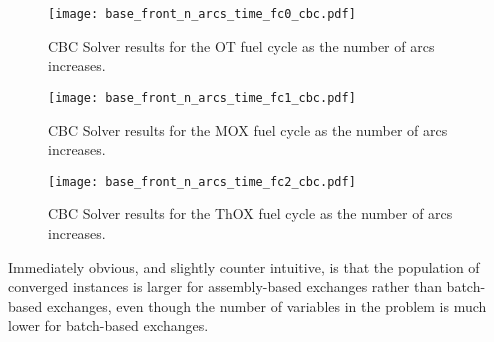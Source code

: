 \begin{figure}[h!]
  \begin{center}
    \texttt{[image: base\_front\_n\_arcs\_time\_fc0\_cbc.pdf]}
    \caption[]{
      \label{fig:base_front_n_arcs_time_fc0_cbc}
      CBC Solver results for the OT fuel cycle as the number of arcs
      increases.
      }
  \end{center}
\end{figure}

\begin{figure}[h!]
  \begin{center}
    \texttt{[image: base\_front\_n\_arcs\_time\_fc1\_cbc.pdf]}
    \caption[]{
      \label{fig:base_front_n_arcs_time_fc1_cbc}
      CBC Solver results for the MOX fuel cycle as the number of arcs
      increases.
      }
  \end{center}
\end{figure}

\begin{figure}[h!]
  \begin{center}
    \texttt{[image: base\_front\_n\_arcs\_time\_fc2\_cbc.pdf]}
    \caption[]{
      \label{fig:base_front_n_arcs_time_fc2_cbc}
      CBC Solver results for the ThOX fuel cycle as the number of arcs
      increases.
      }
  \end{center}
\end{figure}

Immediately obvious, and slightly counter intuitive, is that the population of
converged instances is larger for assembly-based exchanges rather than
batch-based exchanges, even though the number of variables in the problem is
much lower for batch-based exchanges. 





